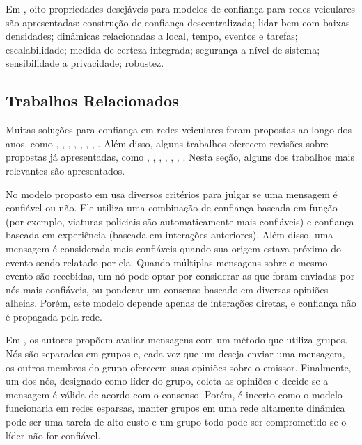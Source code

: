 \begin{resumoextendido}
	Em \citep{zhang2011survey}, oito propriedades desejáveis para modelos de confiança para redes veiculares são apresentadas:
	construção de confiança descentralizada;
	lidar bem com baixas densidades;
	dinâmicas relacionadas a local, tempo, eventos e tarefas;
	escalabilidade;
	medida de certeza integrada;
	segurança a nível de sistema;
	sensibilidade a privacidade;
	robustez.
	
	\subsection*{Trabalhos Relacionados}
	
	Muitas soluções para confiança em redes veiculares foram propostas ao longo dos anos, como \citep{patwardhan2006data}, \citep{gerlach2007trust}, \citep{raya2008data}, \citep{huang2010situation}, \citep{ding2013novel}, \citep{haddadou2013trust}, \citep{liu2016lsot}, \citep{kerrache2016detection}.
	Além disso, alguns trabalhos oferecem revisões sobre propostas já apresentadas, como \citep{zhang2011survey}, \citep{ma2011survey}, \citep{zhang2012trust}, \cite{mejri2014survey}, \citep{soleymani2015trust}, \citep{sengar2016survey}, \citep{dwivedi2016review}.
	Nesta seção, alguns dos trabalhos mais relevantes são apresentados.
	
	No modelo proposto em \citep{minhas2010towards} usa diversos critérios para julgar se uma mensagem é confiável ou não.
	Ele utiliza uma combinação de confiança baseada em função (por exemplo, viaturas policiais são automaticamente mais confiáveis) e confiança baseada em experiência (baseada em interações anteriores).
	Além disso, uma mensagem é considerada mais confiáveis quando sua origem estava próximo do evento sendo relatado por ela.
	Quando múltiplas mensagens sobre o mesmo evento são recebidas, um nó pode optar por considerar as que foram enviadas por nós mais confiáveis, ou ponderar um consenso baseado em diversas opiniões alheias.
	Porém, este modelo depende apenas de interações diretas, e confiança não é propagada pela rede.
	
	Em \citep{chen2010trust}, os autores propõem avaliar mensagens com um método que utiliza grupos.
	Nós são separados em grupos e, cada vez que um deseja enviar uma mensagem, os outros membros do grupo oferecem suas opiniões sobre o emissor.
	Finalmente, um dos nós, designado como líder do grupo, coleta as opiniões e decide se a mensagem é válida de acordo com o consenso.
	Porém, é incerto como o modelo funcionaria em redes esparsas, manter grupos em uma rede altamente dinâmica pode ser uma tarefa de alto custo e um grupo todo pode ser comprometido se o líder não for confiável.
		

\end{resumoextendido}
